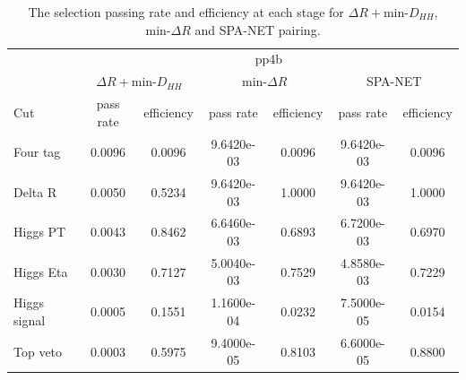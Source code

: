 \documentclass[12pt]{article}
\begin{document}
	\begin{table}[htpb]
		\centering
		\caption{The selection passing rate and efficiency at each stage for $\Delta R + \text{min-}D_{HH}$, $\text{min-}\Delta R$ and SPA-NET pairing.}
		\label{tab:signal_selection_efficiency_background_MV2c10_mindR}
		\begin{tabular}{l|cc|cc|cc}
			     & \multicolumn{6}{c}{pp4b}                                                         \\
				 & \multicolumn{2}{c|}{$\Delta R + \text{min-}D_{HH}$} & \multicolumn{2}{c|}{$\text{min-}\Delta R$} & \multicolumn{2}{c}{SPA-NET} \\
			Cut	 & pass rate               & efficiency               & pass rate           & efficiency          & pass rate    & efficiency   \\ \hline
			Four tag     & 0.0096 & 0.0096 & 9.6420e-03 & 0.0096 & 9.6420e-03 & 0.0096 \\
			Delta R      & 0.0050 & 0.5234 & 9.6420e-03 & 1.0000 & 9.6420e-03 & 1.0000 \\
			Higgs PT     & 0.0043 & 0.8462 & 6.6460e-03 & 0.6893 & 6.7200e-03 & 0.6970 \\
			Higgs Eta    & 0.0030 & 0.7127 & 5.0040e-03 & 0.7529 & 4.8580e-03 & 0.7229 \\
			Higgs signal & 0.0005 & 0.1551 & 1.1600e-04 & 0.0232 & 7.5000e-05 & 0.0154 \\
			Top veto     & 0.0003 & 0.5975 & 9.4000e-05 & 0.8103 & 6.6000e-05 & 0.8800
		\end{tabular}
	\end{table}
\end{document}
